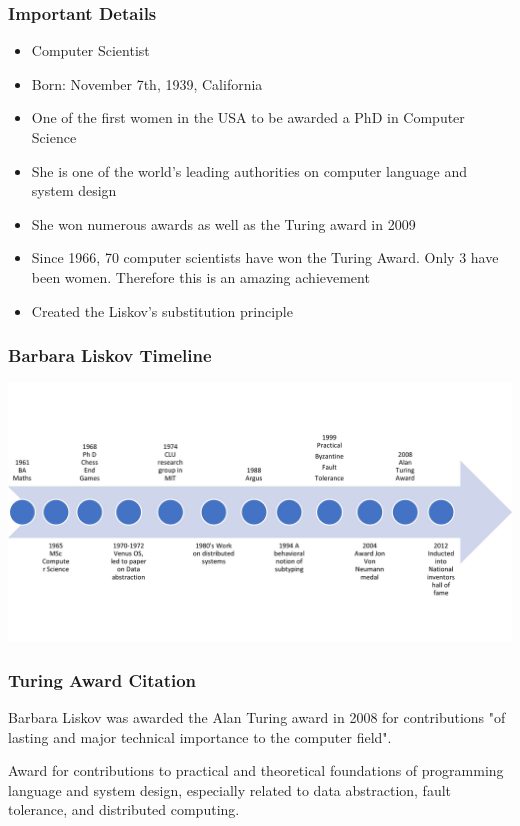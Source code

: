 \documentclass{beamer}
\begin{document}
\begin{frame}
\frametitle{Important Details}
\begin{itemize}
\item Computer Scientist
\item Born: November 7th, 1939, California
\item One of the first women in the USA to be awarded a PhD in Computer Science
\item She is one of the world's leading authorities on computer language and system design
\item She won numerous awards as well as the Turing award in 2009
\item Since 1966, 70 computer scientists have won the Turing Award. Only 3 have been women. Therefore this is an amazing achievement
\item Created the Liskov's substitution principle
\end{itemize}
\end{frame}

\begin{frame}
\frametitle{Barbara Liskov Timeline}

\includegraphics[scale=0.7]{timeline.jpg}

    
\end{frame}
\begin{frame}
\frametitle{Turing Award Citation}
Barbara Liskov was awarded the Alan Turing award in 2008 for  contributions "of lasting and major technical importance to the computer field". 

\vspace{5mm} %

Award for contributions to practical and theoretical foundations of programming language and system design, especially related to data abstraction, fault tolerance, and distributed computing. 

\vspace{5mm}

\end{frame}
\end{document}
